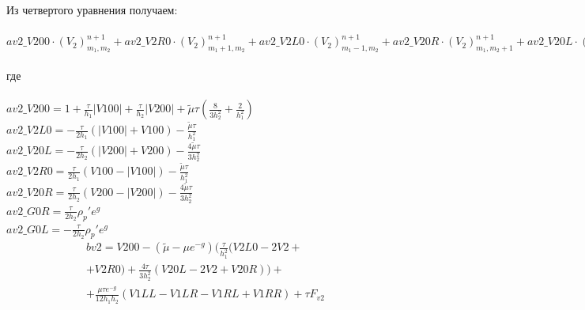 Из четвертого уравнения получаем: \\ \\
$ av2\_V200 \cdot (V_2)_{m_1,m_2}^{n+1} + av2\_V2R0 \cdot (V_2)_{m_1+1,m_2}^{n+1}
+ av2\_V2L0 \cdot (V_2)_{m_1-1,m_2}^{n+1} + av2\_V20R \cdot (V_2)_{m_1,m_2+1}^{n+1}
+ av2\_V20L \cdot (V_2)_{m_1,m_2-1}^{n+1} + av2\_GR0 \cdot G_{m_1 + 1,m_2}^{n+1}
+ av2\_GL0 * G_{m_1-1,m_2}^{n+1} = bv1,$ \\ \\
где \\ \\
$ av2\_V200 = 1 + \frac{\tau}{h_1}|V100| + \frac{\tau}{h_2}|V200| +  \tilde{\mu}\tau(\frac{8}{3h_2^2} + \frac{2}{h_1^2})$ \\
$ av2\_V2L0 = -\frac{\tau}{2h_1}(|V100| + V100) - \frac{\tilde \mu\tau}  {h_1^2}  $ \\
$ av2\_V20L = -\frac{\tau}{2h_2}(|V200| + V200) - \frac{4\tilde \mu\tau}{3h_2^2} $ \\
$ av2\_V2R0 =  \frac{\tau}{2h_1}(V100 - |V100|) - \frac{\tilde \mu\tau}  {h_1^2}  $ \\ 
$ av2\_V20R =  \frac{\tau}{2h_2}(V200 - |V200|) - \frac{4\tilde \mu\tau}{3h_2^2} $ \\
$ av2\_G0R  =  \frac{\tau}{2h_2}\rho_p'e^g $ \\
$ av2\_G0L  = -\frac{\tau}{2h_2}\rho_p'e^g $
\begin{multline*}
bv2 = V200 - (\tilde \mu - \mu e^{-g})(\frac{\tau}{h_1^2}(V2L0 - 2V2 +
\\ + V2R0) + \frac{4\tau}{3h_2^2}(V20L - 2V2 + V20R)) +
\\ + \frac{\mu\tau e^{-g}}{12h_1h_2}(V1LL - V1LR - V1RL + V1RR) + \tau F_{v2}
\end{multline*}